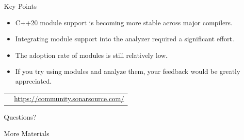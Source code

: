 \documentclass[aspectratio=169]{beamer}
\begin{document}
\begin{frame}[standout]
  \begin{block}{{\color{white}Key Points}}
    \small
    \begin{itemize}
      \item C++20 module support is becoming more stable across major compilers.
      \item Integrating module support into the analyzer required a significant effort.
      \item The adoption rate of modules is still relatively low.
      \item If you try using modules and analyze them, your feedback would be greatly appreciated.
    \end{itemize}
    \vspace{1em}
    \centering
    \begin{tabular}{m{2em} p{18em}}
       & \href{https://community.sonarsource.com/}{\color{cyan}https://community.sonarsource.com/}
    \end{tabular}

  \end{block}
  \begin{block}{}
    \centering
    Questions?
  \end{block}
\end{frame}

\begin{frame}{More Materials}
  \printbibliography[heading=none]
\end{frame}
\end{document}
